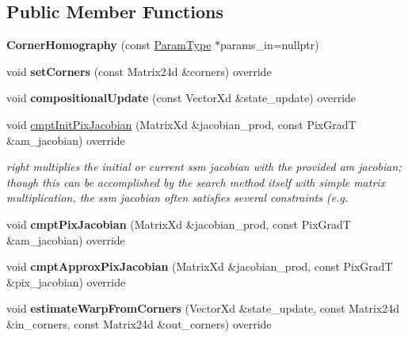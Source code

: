 \subsection*{Public Member Functions}
\begin{DoxyCompactItemize}
\item 
\hypertarget{classCornerHomography_a77e1e2620b3a6ed6e83135142ab6731d}{{\bfseries Corner\-Homography} (const \hyperlink{structCornerHomographyParams}{Param\-Type} $\ast$params\-\_\-in=nullptr)}\label{classCornerHomography_a77e1e2620b3a6ed6e83135142ab6731d}

\item 
\hypertarget{classCornerHomography_a187bb46c299eced70506cd62eb3e7adf}{void {\bfseries set\-Corners} (const Matrix24d \&corners) override}\label{classCornerHomography_a187bb46c299eced70506cd62eb3e7adf}

\item 
\hypertarget{classCornerHomography_a3ea82a14cfbb776cdf7d71735a8caaba}{void {\bfseries compositional\-Update} (const Vector\-Xd \&state\-\_\-update) override}\label{classCornerHomography_a3ea82a14cfbb776cdf7d71735a8caaba}

\item 
void \hyperlink{classCornerHomography_a09026e49b30f58affc5b0324747c8d1e}{cmpt\-Init\-Pix\-Jacobian} (Matrix\-Xd \&jacobian\-\_\-prod, const Pix\-Grad\-T \&am\-\_\-jacobian) override
\begin{DoxyCompactList}\small\item\em right multiplies the initial or current ssm jacobian with the provided am jacobian; though this can be accomplished by the search method itself with simple matrix multiplication, the ssm jacobian often satisfies several constraints (e.\-g. \end{DoxyCompactList}\item 
\hypertarget{classCornerHomography_adb3bf61899a9a6a907079fb9ac3823ef}{void {\bfseries cmpt\-Pix\-Jacobian} (Matrix\-Xd \&jacobian\-\_\-prod, const Pix\-Grad\-T \&am\-\_\-jacobian) override}\label{classCornerHomography_adb3bf61899a9a6a907079fb9ac3823ef}

\item 
\hypertarget{classCornerHomography_ab47607901f8e65f85ccbb5be183191f4}{void {\bfseries cmpt\-Approx\-Pix\-Jacobian} (Matrix\-Xd \&jacobian\-\_\-prod, const Pix\-Grad\-T \&pix\-\_\-jacobian) override}\label{classCornerHomography_ab47607901f8e65f85ccbb5be183191f4}

\item 
\hypertarget{classCornerHomography_a756448c9ee587e45d5804da9fc62adb6}{void {\bfseries estimate\-Warp\-From\-Corners} (Vector\-Xd \&state\-\_\-update, const Matrix24d \&in\-\_\-corners, const Matrix24d \&out\-\_\-corners) override}\label{classCornerHomography_a756448c9ee587e45d5804da9fc62adb6}


\end{DoxyCompactItemize}
